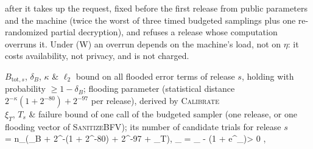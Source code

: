 after it takes up the request, fixed before the first release from public parameters and the machine (twice the worst of three timed budgeted samplings plus one re-randomized partial decryption), and refuses a release whose computation overruns it. Under (W) an overrun depends on the machine's load, not on $\eta$: it costs availability, not privacy, and is not charged.

$B_{\mathrm{tot},s}$, $\delta_B$, $\kappa$ & $\ell_2$ bound on all flooded error terms of release $s$, holding with probability $\ge 1 - \delta_B$; flooding parameter (statistical distance $2^{-\kappa}(1 + 2^{-80}) + 2^{-97}$ per release), derived by \textsc{Calibrate} \\
$\xi_T$, $T_s$ & failure bound of one call of the budgeted sampler (one release, or one flooding vector of \textsc{SanitizeBFV}); its number of candidate trials for release $s$ \\

    \gamma = n_{}\bigl(\delta_B + 2^{-\kappa}(1 + 2^{-80}) + 2^{-97} + \xi_T\bigr), \qquad \delta_{} = \delta_{} - (1 + e^{\varepsilon_{}})\gamma > 0 ,

